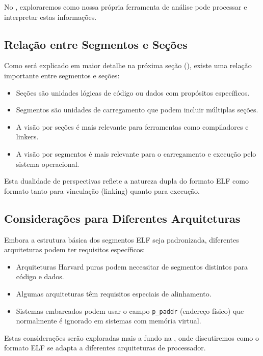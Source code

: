 No , exploraremos como nossa própria ferramenta de análise pode processar e interpretar estas informações.

\subsection{Relação entre Segmentos e Seções}\label{subsec:segments_and_sections}

Como será explicado em maior detalhe na próxima seção (), existe uma relação importante entre segmentos e seções:

\begin{itemize}
    \item Seções são unidades lógicas de código ou dados com propósitos específicos.
    \item Segmentos são unidades de carregamento que podem incluir múltiplas seções.
    \item A visão por seções é mais relevante para ferramentas como compiladores e linkers.
    \item A visão por segmentos é mais relevante para o carregamento e execução pelo sistema operacional.
\end{itemize}

Esta dualidade de perspectivas reflete a natureza dupla do formato ELF como formato tanto para vinculação (linking) quanto para execução.

\subsection{Considerações para Diferentes Arquiteturas}\label{subsec:arch_considerations}

Embora a estrutura básica dos segmentos ELF seja padronizada, diferentes arquiteturas podem ter requisitos específicos:

\begin{itemize}
    \item Arquiteturas Harvard puras podem necessitar de segmentos distintos para código e dados.
    \item Algumas arquiteturas têm requisitos especiais de alinhamento.
    \item Sistemas embarcados podem usar o campo \texttt{p\_paddr} (endereço físico) que normalmente é ignorado em sistemas com memória virtual.
\end{itemize}

Estas considerações serão exploradas mais a fundo na , onde discutiremos como o formato ELF se adapta a diferentes arquiteturas de processador.